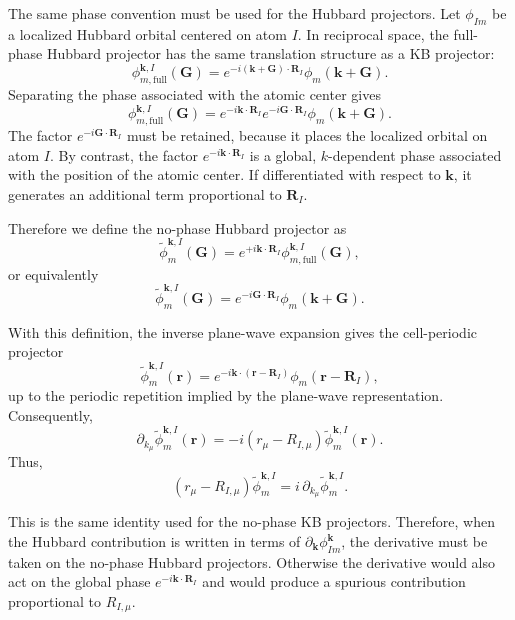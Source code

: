 \documentclass[11pt]{article}
\begin{document}
The same phase convention must be used for the Hubbard projectors. Let
$\phi_{Im}$ be a localized Hubbard orbital centered on atom $I$. In
reciprocal space, the full-phase Hubbard projector has the same
translation structure as a KB projector:
\begin{equation}
\phi^{\mathbf k,I}_{m,\mathrm{full}}(\mathbf G)
=
e^{-i(\mathbf k+\mathbf G)\cdot\mathbf R_I}
\phi_m(\mathbf k+\mathbf G).
\end{equation}
Separating the phase associated with the atomic center gives
\begin{equation}
\phi^{\mathbf k,I}_{m,\mathrm{full}}(\mathbf G)
=
e^{-i\mathbf k\cdot\mathbf R_I}
e^{-i\mathbf G\cdot\mathbf R_I}
\phi_m(\mathbf k+\mathbf G).
\end{equation}
The factor $e^{-i\mathbf G\cdot\mathbf R_I}$ must be retained, because
it places the localized orbital on atom $I$. By contrast, the factor
$e^{-i\mathbf k\cdot\mathbf R_I}$ is a global, $k$-dependent phase
associated with the position of the atomic center. If differentiated
with respect to $\mathbf k$, it generates an additional term
proportional to $\mathbf R_I$.

Therefore we define the no-phase Hubbard projector as
\begin{equation}
\widetilde{\phi}^{\mathbf k,I}_{m}(\mathbf G)
=
e^{+i\mathbf k\cdot\mathbf R_I}
\phi^{\mathbf k,I}_{m,\mathrm{full}}(\mathbf G),
\end{equation}
or equivalently
\begin{equation}
\widetilde{\phi}^{\mathbf k,I}_{m}(\mathbf G)
=
e^{-i\mathbf G\cdot\mathbf R_I}
\phi_m(\mathbf k+\mathbf G).
\end{equation}

With this definition, the inverse plane-wave expansion gives the
cell-periodic projector
\begin{equation}
\widetilde{\phi}^{\mathbf k,I}_{m}(\mathbf r)
=
e^{-i\mathbf k\cdot(\mathbf r-\mathbf R_I)}
\phi_m(\mathbf r-\mathbf R_I),
\end{equation}
up to the periodic repetition implied by the plane-wave representation.
Consequently,
\begin{equation}
\partial_{k_\mu}
\widetilde{\phi}^{\mathbf k,I}_{m}(\mathbf r)
=
-i(r_\mu-R_{I,\mu})
\widetilde{\phi}^{\mathbf k,I}_{m}(\mathbf r).
\end{equation}
Thus,
\begin{equation}
(r_\mu-R_{I,\mu})
\widetilde{\phi}^{\mathbf k,I}_{m}
=
i\,\partial_{k_\mu}
\widetilde{\phi}^{\mathbf k,I}_{m}.
\end{equation}

This is the same identity used for the no-phase KB projectors. Therefore,
when the Hubbard contribution is written in terms of
$\partial_{\mathbf k}\phi_{Im}^{\mathbf k}$, the derivative must be
taken on the no-phase Hubbard projectors. Otherwise the derivative would
also act on the global phase $e^{-i\mathbf k\cdot\mathbf R_I}$ and would
produce a spurious contribution proportional to $R_{I,\mu}$.
\end{document}
